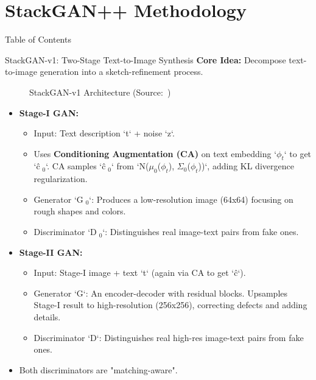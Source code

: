 \documentclass{beamer}
\newcommand{\paperfigure}[3][width=\textwidth]{%
    \begin{figure}%
        \centering%
        \caption{#3 (Source:~\cite{stackgan++})}%
        \label{fig:#2}%
    \end{figure}%
}
\begin{document}
\section{StackGAN++ Methodology}
\begin{frame}{Table of Contents}
    \tableofcontents[currentsection]
\end{frame}

\begin{frame}{StackGAN-v1: Two-Stage Text-to-Image Synthesis}
    \textbf{Core Idea:} Decompose text-to-image generation into a sketch-refinement process.
    \paperfigure[width=0.9\textwidth]{fig1_stackgan_v1}{StackGAN-v1 Architecture}
    \begin{itemize}
        \item \textbf{Stage-I GAN:}
            \begin{itemize}
                \item Input: Text description `t` + noise `z`.
                \item Uses \textbf{Conditioning Augmentation (CA)} on text embedding `$\phi_t$` to get `ĉ$\phantom{.}_0$`. CA samples `ĉ$\phantom{.}_0$` from `N($\mu_0$($\phi_t$), $\Sigma_0$($\phi_t$))`, adding KL divergence regularization.
                \item Generator `G$\phantom{.}_0$`: Produces a low-resolution image (64x64) focusing on rough shapes and colors.
                \item Discriminator `D$\phantom{.}_0$`: Distinguishes real image-text pairs from fake ones.
            \end{itemize}
        \item \textbf{Stage-II GAN:}
            \begin{itemize}
                \item Input: Stage-I image + text `t` (again via CA to get `ĉ`).
                \item Generator `G`: An encoder-decoder with residual blocks. Upsamples Stage-I result to high-resolution (256x256), correcting defects and adding details.
                \item Discriminator `D`: Distinguishes real high-res image-text pairs from fake ones.
            \end{itemize}
        \item Both discriminators are "matching-aware".
    \end{itemize}
\end{frame}
\end{document}
